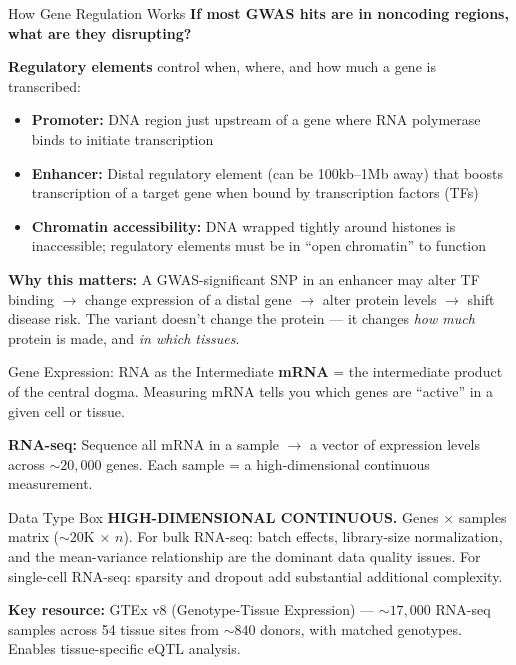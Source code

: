 \documentclass[aspectratio=169,10pt]{beamer}
\begin{document}
\begin{frame}{How Gene Regulation Works}
\textbf{If most GWAS hits are in noncoding regions, what are they disrupting?}

\vspace{0.3em}
\textbf{Regulatory elements} control when, where, and how much a gene is transcribed:
\begin{itemize}[<+->]\itemsep0.1em
    \item \textbf{Promoter:} DNA region just upstream of a gene where RNA polymerase binds to initiate transcription
    \item \textbf{Enhancer:} Distal regulatory element (can be 100kb--1Mb away) that boosts transcription of a target gene when bound by transcription factors (TFs)
    \item \textbf{Chromatin accessibility:} DNA wrapped tightly around histones is inaccessible; regulatory elements must be in ``open chromatin'' to function
\end{itemize}

\vspace{0.2em}
\textbf{Why this matters:} A GWAS-significant SNP in an enhancer may alter TF binding $\to$ change expression of a distal gene $\to$ alter protein levels $\to$ shift disease risk. The variant doesn't change the protein --- it changes \emph{how much} protein is made, and \emph{in which tissues}.
\end{frame}

\begin{frame}{Gene Expression: RNA as the Intermediate}
\textbf{mRNA} = the intermediate product of the central dogma. Measuring mRNA tells you which genes are ``active'' in a given cell or tissue.

\vspace{0.3em}
\textbf{RNA-seq:} Sequence all mRNA in a sample $\to$ a vector of expression levels across ${\sim}20{,}000$ genes. Each sample = a high-dimensional continuous measurement.

\vspace{0.3em}
\begin{block}{Data Type Box}
\textbf{HIGH-DIMENSIONAL CONTINUOUS.} Genes $\times$ samples matrix (${\sim}20$K $\times$ $n$). For bulk RNA-seq: batch effects, library-size normalization, and the mean-variance relationship are the dominant data quality issues. For single-cell RNA-seq: sparsity and dropout add substantial additional complexity.
\end{block}

\vspace{0.2em}
{\footnotesize \textbf{Key resource:} GTEx v8 (Genotype-Tissue Expression) --- ${\sim}17{,}000$ RNA-seq samples across 54 tissue sites from ${\sim}840$ donors, with matched genotypes. Enables tissue-specific eQTL analysis.}
\end{frame}
\end{document}
